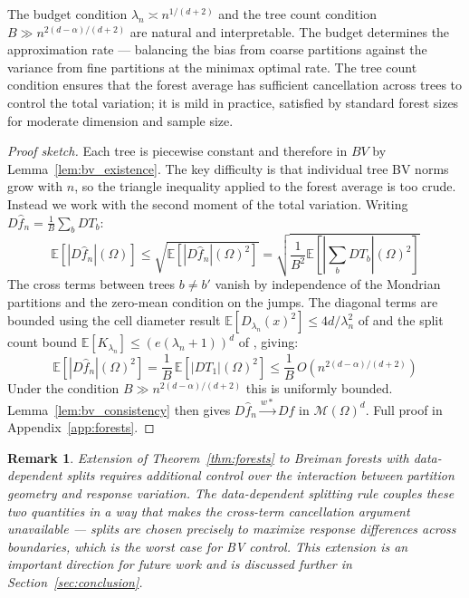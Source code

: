 \documentclass[12pt]{article}
\newtheorem{remark}{Remark}
\newcommand{\cM}{\mathcal{M}(\Omega)^d}
\newcommand{\fn}{\hat{f}_n}
\begin{document}
	The budget condition $\lambda_n \asymp n^{1/(d+2)}$ and the tree count condition $B
	\gg n^{2(d-\alpha)/(d+2)}$ are natural and interpretable. The budget determines the
	approximation rate --- balancing the bias from coarse partitions against the variance
	from fine partitions at the minimax optimal rate. The tree count condition ensures that
	the forest average has sufficient cancellation across trees to control the total
	variation; it is mild in practice, satisfied by standard forest sizes for moderate
	dimension and sample size.
	
	\begin{proof}[Proof sketch]
		Each tree is piecewise constant and therefore in $BV$ by
		Lemma~\ref{lem:bv_existence}. The key difficulty is that individual tree BV norms
		grow with $n$, so the triangle inequality applied to the forest average is too crude.
		Instead we work with the second moment of the total variation. Writing $D\fn =
		\frac{1}{B}\sum_b DT_b$:
		\begin{equation}
			\mathbb{E}[|D\fn|(\Omega)] \leq \sqrt{\mathbb{E}[|D\fn|(\Omega)^2]}
			= \sqrt{\frac{1}{B^2}\mathbb{E}\!\left[\left|\sum_b DT_b\right|(\Omega)^2\right]}
		\end{equation}
		The cross terms between trees $b \neq b'$ vanish by independence of the Mondrian
		partitions and the zero-mean condition on the jumps. The diagonal terms are bounded
		using the cell diameter result $\mathbb{E}[D_{\lambda_n}(x)^2] \leq 4d/\lambda_n^2$
		of \citet{roy2009mondrian} and the split count bound $\mathbb{E}[K_{\lambda_n}]
		\leq (e(\lambda_n+1))^d$ of \citet{mourtada2017mondrian}, giving:
		\begin{equation}
			\mathbb{E}[|D\fn|(\Omega)^2]
			= \frac{1}{B}\,\mathbb{E}[|DT_1|(\Omega)^2]
			\leq \frac{1}{B}\,O(n^{2(d-\alpha)/(d+2)})
		\end{equation}
		Under the condition $B \gg n^{2(d-\alpha)/(d+2)}$ this is uniformly bounded.
		Lemma~\ref{lem:bv_consistency} then gives $D\fn \xrightarrow{w*} Df$ in $\cM$.
		Full proof in Appendix~\ref{app:forests}.
	\end{proof}
	
	\begin{remark}
		Extension of Theorem~\ref{thm:forests} to Breiman forests with data-dependent splits
		requires additional control over the interaction between partition geometry and
		response variation. The data-dependent splitting rule couples these two quantities in
		a way that makes the cross-term cancellation argument unavailable --- splits are
		chosen precisely to maximize response differences across boundaries, which is the
		worst case for BV control. This extension is an important direction for future work
		and is discussed further in Section~\ref{sec:conclusion}.
	\end{remark}
	
\end{document}
